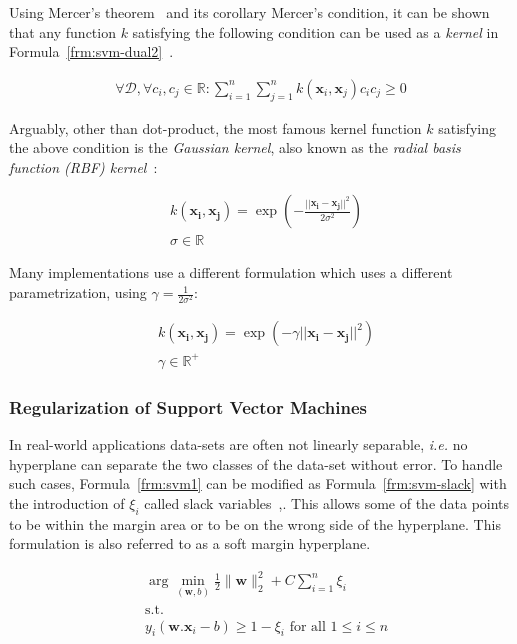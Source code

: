 Using Mercer's theorem~\cite{mercer-theorem} and its corollary Mercer's condition, it can be shown that any function $k$ satisfying the following condition can be used as a \emph{kernel} in Formula~\ref{frm:svm-dual2}~\cite[Ch. 2.2]{learning-with-kernels}.

\begin{align}
  \forall \mathcal{D}, \forall c_i, c_j \in \mathbb{R}: \sum_{i=1}^n\sum_{j=1}^n k(\mathbf{x}_i, \mathbf{x}_j) c_i c_j \geq 0
  \label{frm:positive-definite}
\end{align}

Arguably, other than dot-product, the most famous kernel function $k$ satisfying the above condition is the \emph{Gaussian kernel}, also known as the \emph{radial basis function (RBF) kernel}~\cite[Ch. 2]{learning-with-kernels}:

\begin{align}
  &k(\mathbf{x_i}, \mathbf{x_j}) = \exp\left(-\frac{||\mathbf{x_i} - \mathbf{x_j}||^2}{2\sigma^2}\right) \nonumber \\
  &\sigma \in \mathbb{R}
  \label{frm:rbf-kernel1}
\end{align}

Many implementations use a different formulation which uses a different parametrization, using $\gamma=\frac{1}{2\sigma^2}$:

\begin{align}
  &k(\mathbf{x_i}, \mathbf{x_j}) = \exp\left(-\gamma||\mathbf{x_i} - \mathbf{x_j}||^2\right) \nonumber \\
  &\gamma \in \mathbb{R}^+
  \label{frm:rbf-kernel2}
\end{align}

\subsubsection{Regularization of Support Vector Machines}
In real-world applications data-sets are often not linearly separable, \emph{i.e.} no hyperplane can separate the two classes of the data-set without error. To handle such cases, Formula~\ref{frm:svm1} can be modified as Formula~\ref{frm:svm-slack} with the introduction of $\xi_i$ called slack variables~\cite{cortes1995support},\cite[Ch. 7.5]{learning-with-kernels}. This allows some of the data points to be within the margin area or to be on the wrong side of the hyperplane. This formulation is also referred to as a soft margin hyperplane.

\begin{align}
  &\arg\min_{(\mathbf{w},b)}\frac{1}{2}\|\mathbf{w}\|_2^2 + C \sum_{i=1}^n \xi_i \nonumber \\
  &\text{s.t.} \nonumber \\
  &y_i (\mathbf{w} . \mathbf{x}_i - b)\geq 1 - \xi_i \text{ for all } 1 \leq i \leq n
  \label{frm:svm-slack}
\end{align}

